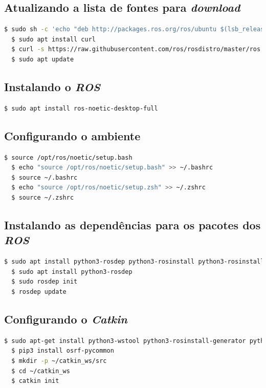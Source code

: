 \documentclass[12pt,a4paper,oneside]{book}
\begin{document}
\subsection{Atualizando a lista de fontes para \textit{download}}
\begin{lstlisting}[language=bash] 
  $ sudo sh -c 'echo "deb http://packages.ros.org/ros/ubuntu $(lsb_release -sc) main" > /etc/apt/sources.list.d/ros-latest.list'
  $ sudo apt install curl
  $ curl -s https://raw.githubusercontent.com/ros/rosdistro/master/ros.asc | sudo apt-key add -
  $ sudo apt update
\end{lstlisting}

\subsection{Instalando o \textit{ROS}}
\begin{lstlisting}[language=bash] 
  $ sudo apt install ros-noetic-desktop-full
\end{lstlisting}

\subsection{Configurando o ambiente}
\begin{lstlisting}[language=bash] 
  $ source /opt/ros/noetic/setup.bash
  $ echo "source /opt/ros/noetic/setup.bash" >> ~/.bashrc
  $ source ~/.bashrc
  $ echo "source /opt/ros/noetic/setup.zsh" >> ~/.zshrc
  $ source ~/.zshrc
\end{lstlisting}

\subsection{Instalando as dependências para os pacotes dos \textit{ROS}}
\begin{lstlisting}[language=bash] 
  $ sudo apt install python3-rosdep python3-rosinstall python3-rosinstall-generator python3-wstool build-essential
  $ sudo apt install python3-rosdep
  $ sudo rosdep init
  $ rosdep update
\end{lstlisting}

\subsection{Configurando o \textit{Catkin}}
\begin{lstlisting}[language=bash] 
  $ sudo apt-get install python3-wstool python3-rosinstall-generator python3-catkin-lint python3-pip python3-catkin-tools
  $ pip3 install osrf-pycommon
  $ mkdir -p ~/catkin_ws/src
  $ cd ~/catkin_ws
  $ catkin init
\end{lstlisting}
\end{document}
